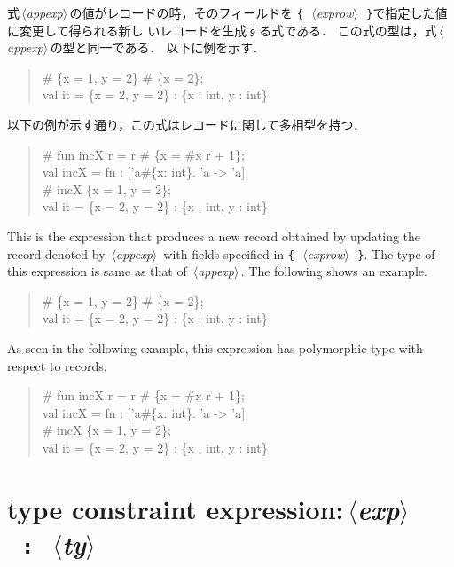\documentclass{jbook}
\newcommand{\txt}[2]{#2}
\newcommand{\nonterm}[1]{\mbox{$\,\langle$}{\it #1}\mbox{$\rangle\,$}}
\newcommand{\term}[1]{\mbox{{\tt #1}}}
\newenvironment{program}{\begin{quote}\begin{tt}}%
                        {\end{tt}\end{quote}}
\begin{document}
\ifjp%
	式\nonterm{appexp}の値がレコードの時，そのフィールドを
\term{\{}\ \nonterm{exprow}\ \term{\}}で指定した値に変更して得られる新し
いレコードを生成する式である．
	この式の型は，式\nonterm{appexp}の型と同一である．
	以下に例を示す．
\begin{program}
\# \{x = 1, y = 2\} \# \{x = 2\};
\\
val it = \{x = 2, y = 2\} : \{x : int, y : int\}
\end{program}
	以下の例が示す通り，この式はレコードに関して多相型を持つ．
\begin{program}
\# fun incX r = r \# \{x = \#x r + 1\};
\\
val incX = fn : ['a\#\{x: int\}. 'a -> 'a]
\\
\# incX \{x = 1, y = 2\};
\\
val it  = \{x = 2, y = 2\} : \{x : int, y : int\}
\end{program}
\else%
	This is the expression that produces a new record
obtained by updating the record denoted by \nonterm{appexp}
with fields specified in \term{\{}\ \nonterm{exprow}\ \term{\}}.
	The type of this expression is same as that
of \nonterm{appexp}.
	The following shows an example.
\begin{program}
\# \{x = 1, y = 2\} \# \{x = 2\};
\\
val it = \{x = 2, y = 2\} : \{x : int, y : int\}
\end{program}
	As seen in the following example, this expression has
polymorphic type with respect to records.
\begin{program}
\# fun incX r = r \# \{x = \#x r + 1\};
\\
val incX = fn : ['a\#\{x: int\}. 'a -> 'a]
\\
\# incX \{x = 1, y = 2\};
\\
val it  = \{x = 2, y = 2\} : \{x : int, y : int\}
\end{program}
\fi%

\section{\txt{型制約式}{type constraint expression}:\nonterm{exp}\ \term{:}\ \nonterm{ty}}
\end{document}
